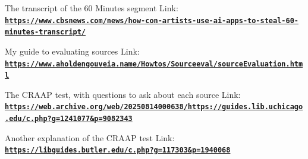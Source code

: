 \documentclass[12pt]{article}
\begin{document}
The transcript of the 60 Minutes segment
Link: \href{https://www.cbsnews.com/news/how-con-artists-use-ai-apps-to-steal-60-minutes-transcript/}{\textbf{\nolinkurl{https://www.cbsnews.com/news/how-con-artists-use-ai-apps-to-steal-60-minutes-transcript/}}}

My guide to evaluating sources
Link: \href{https://www.aholdengouveia.name/Howtos/Sourceeval/sourceEvaluation.html}{\textbf{\nolinkurl{https://www.aholdengouveia.name/Howtos/Sourceeval/sourceEvaluation.html}}}

The CRAAP test, with questions to ask about each source
Link: \href{https://web.archive.org/web/20250814000638/https://guides.lib.uchicago.edu/c.php?g=1241077&p=9082343}{\textbf{\nolinkurl{https://web.archive.org/web/20250814000638/https://guides.lib.uchicago.edu/c.php?g=1241077&p=9082343}}}

Another explanation of the CRAAP test
Link: \href{https://libguides.butler.edu/c.php?g=117303&p=1940068}{\textbf{\nolinkurl{https://libguides.butler.edu/c.php?g=117303&p=1940068}}}
\end{document}
